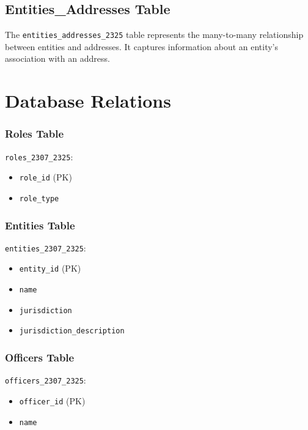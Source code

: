 \documentclass{article}
\begin{document}
\subsection*{Entities\_Addresses Table}
The \texttt{entities\_addresses\_2325} table represents the many-to-many relationship between entities and addresses. It captures information about an entity's association with an address.


\section*{\centering Database Relations}


\begin{minipage}{0.5\textwidth}

    \subsubsection*{Roles Table}
    \texttt{roles\_2307\_2325}:
    \begin{itemize}
        \item \texttt{role\_id} (PK)
        \item \texttt{role\_type}
    \end{itemize}

    \subsubsection*{Entities Table}
    \texttt{entities\_2307\_2325}:
    \begin{itemize}
        \item \texttt{entity\_id} (PK)
        \item \texttt{name}
        \item \texttt{jurisdiction}
        \item \texttt{jurisdiction\_description}
    \end{itemize}

    \subsubsection*{Officers Table}
    \texttt{officers\_2307\_2325}:
    \begin{itemize}
        \item \texttt{officer\_id} (PK)
        \item \texttt{name}
    \end{itemize}


\end{minipage}
\end{document}
